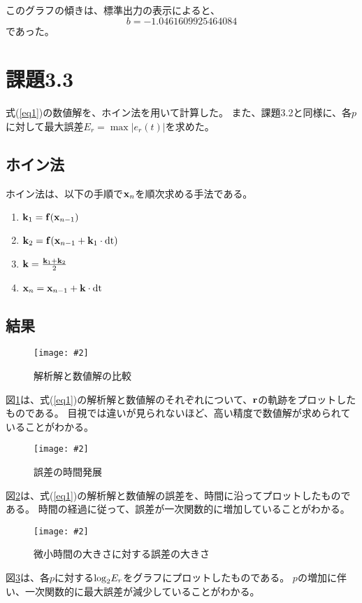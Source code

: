 \documentclass[11pt]{jsarticle}
\newcommand{\fg}[3]{ %
    \begin{figure}
        \texttt{[image: \#2]}
        \caption{#3}
        \label{#1}
    \end{figure}
}
\newcommand{\fr}[1]{図\ref{#1}}
\newcommand{\er}[1]{式(\ref{#1})}
\newcommand{\kb}{{\bf k}}
\newcommand{\xb}{{\bf x}}
\newcommand{\fb}{{\bf f}}
\newcommand{\dtn}{{\rm dt}}
\begin{document}
            このグラフの傾きは、標準出力の表示によると、
            \[
                b = -1.0461609925464084
            \]
            であった。

    \section{課題3.3}
        \er{eq1}の数値解を、ホイン法を用いて計算した。
        また、課題3.2と同様に、各$p$に対して最大誤差$E_r = \max|e_r(t)|$を求めた。

        \subsection{ホイン法}
            ホイン法は、以下の手順で${\bf x}_{n}$を順次求める手法である。

            \begin{enumerate}
                \item $\kb_1 = \fb(\xb_{n-1})$
                \item $\kb_2 = \fb(\xb_{n-1} + \kb_1 \cdot \dtn)$
                \item $\kb = \frac{\kb_1 + \kb_2}{2}$
                \item $\xb_{n} = \xb_{n-1} + \kb \cdot \dtn$
            \end{enumerate}

        \subsection{結果}
            \fg{fig4}{graphs/heun/rc_ra.eps}{解析解と数値解の比較} 

            \fr{fig4}は、\er{eq1}の解析解と数値解のそれぞれについて、${\bf r}$の軌跡をプロットしたものである。
            目視では違いが見られないほど、高い精度で数値解が求められていることがわかる。

            \fg{fig5}{graphs/heun/error_by_time.eps}{誤差の時間発展}

            \fr{fig5}は、\er{eq1}の解析解と数値解の誤差を、時間に沿ってプロットしたものである。
            時間の経過に従って、誤差が一次関数的に増加していることがわかる。

            \fg{fig6}{graphs/heun/error_by_p.eps}{微小時間の大きさに対する誤差の大きさ}

            \fr{fig6}は、各$p$に対する${\rm log}_2E_r$をグラフにプロットしたものである。
            $p$の増加に伴い、一次関数的に最大誤差が減少していることがわかる。
\end{document}
